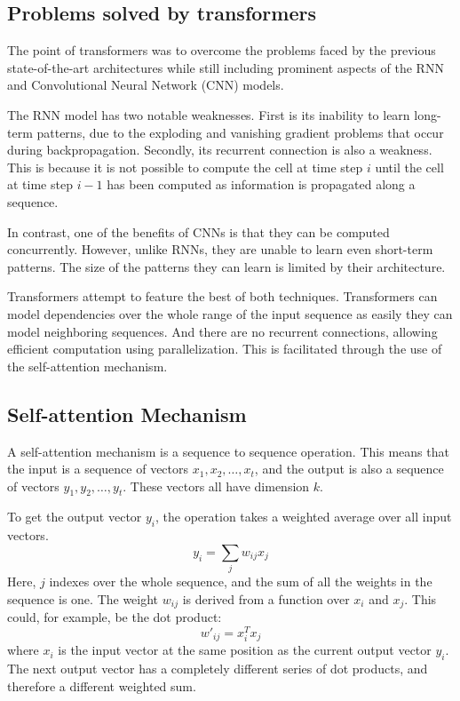 \subsection{Problems solved by transformers}
The point of transformers was to overcome the problems faced by the previous state-of-the-art architectures while still including prominent aspects of the RNN and Convolutional Neural Network (CNN) models.

The RNN model has two notable weaknesses. First is its inability to learn long-term patterns, due to the exploding and vanishing gradient problems that occur during backpropagation.
Secondly, its recurrent connection is also a weakness. This is because it is not possible to compute the cell at time step $i$ until the cell at time step $i-1$ has been computed as information is propagated along a sequence.

In contrast, one of the benefits of CNNs is that they can be computed concurrently. However, unlike RNNs, they are unable to learn even short-term patterns. The size of the patterns they can learn is limited by their architecture.

Transformers attempt to feature the best of both techniques.
Transformers can model dependencies over the whole range of the input sequence as easily they can model neighboring sequences. And there are no recurrent connections, allowing efficient computation using parallelization. This is facilitated through the use of the self-attention mechanism.\cite{TransformersScratchPeterbloem}


\subsection{Self-attention Mechanism}
A self-attention mechanism is a sequence to sequence operation. This means that the input is a sequence of vectors $x_{1},x_{2},\ldots, x_{t}$, and the output is also a sequence of vectors $y_{1},y_{2},\ldots, y_{t}$.
These vectors all have dimension $k$.

To get the output vector $y_{i}$, the operation takes a weighted average over all input vectors.
$$
y_{i}=\sum_{j}w_{ij}x_{j}
$$
Here, $j$ indexes over the whole sequence, and the sum of all the weights in the sequence is one.
The weight $w_{ij}$ is derived from a function over $x_{i}$ and $x_{j}$.
This could, for example, be the dot product:
$$
w'_{ij}=x_{i}^Tx_{j}
$$
where $x_{i}$ is the input vector at the same position as the current output vector $y_{i}$.
The next output vector has a completely different series of dot products, and therefore a different weighted sum.

